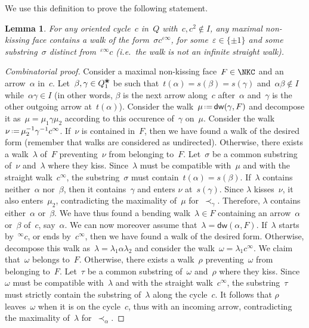 \documentclass{amsart}
\newtheorem{lemma}[theorem]{Lemma}
\theoremstyle{definition}
\newcommand{\eqdef}{\mbox{\,\raisebox{0.2ex}{\scriptsize\ensuremath{\mathrm:}}\ensuremath{=}\,}} %
\newcommand{\ie}{\textit{i.e.}~} %
\newcommand{\blossom}{^\text{\ding{96}}} %
\newcommand{\distinguishedWalk}[2]{\mathsf{dw}(#1,#2)} %
\begin{document}
We use this definition to prove the following statement.

\begin{lemma}
\label{lem:walksThroughcycles}
For any oriented cycle~$c$ in~$Q$ with~$c, c^2\notin I$, any maximal non-kissing face contains a walk of the form~$\sigma c^{\varepsilon\infty}$, for some~$\varepsilon\in\{\pm1\}$ and some substring~$\sigma$ distinct from~$^{\varepsilon\infty}c$ (\ie the walk is not an infinite straight walk).
\end{lemma}

\begin{proof}[Combinatorial proof]
Consider a maximal non-kissing face~$F \in \NKC$ and an arrow~$\alpha$ in~$c$.
Let~$\beta, \gamma \in Q_1\blossom$ be such that~$t(\alpha) = s(\beta) = s(\gamma)$ and~$\alpha\beta \notin I$ while~$\alpha\gamma \in I$ (in other words, $\beta$ is the next arrow along~$c$ after~$\alpha$ and~$\gamma$ is the other outgoing arrow at~$t(\alpha)$).
Consider the walk~$\mu \eqdef \distinguishedWalk{\gamma}{F}$ and decompose it as~$\mu = \mu_1 \gamma \mu_2$ according to this occurence of~$\gamma$ on~$\mu$.
Consider the walk~$\nu \eqdef \mu_2^{-1} \gamma^{-1} c^\infty$.
If~$\nu$ is contained in~$F$, then we have found a walk of the desired form (remember that walks are considered as undirected).
Otherwise, there exists a walk~$\lambda$ of~$F$ preventing~$\nu$ from belonging to~$F$.
Let~$\sigma$ be a common substring of~$\nu$ and~$\lambda$ where they kiss.
Since~$\lambda$ must be compatible with~$\mu$ and with the straight walk~$c^\infty$, the substring~$\sigma$ must contain~${t(\alpha) = s(\beta)}$.
If~$\lambda$ contains neither~$\alpha$ nor~$\beta$, then it contains~$\gamma$ and enters $\nu$ at~$s(\gamma)$.
Since $\lambda$ kisses~$\nu$, it also enters~$\mu_2$, contradicting the maximality of~$\mu$ for~$\prec_\gamma$.
Therefore, $\lambda$ contains either~$\alpha$ or~$\beta$.
We have thus found a bending walk~$\lambda \in F$ containing an arrow~$\alpha$ or~$\beta$ of~$c$, say~$\alpha$.
We can now moreover assume that~$\lambda = \distinguishedWalk{\alpha}{F}$.
If~$\lambda$ starts by~$^\infty c$, or ends by~$c^\infty$, then we have found a walk of the desired form.
Otherwise, decompose this walk as~$\lambda = \lambda_1 \alpha \lambda_2$ and consider the walk~$\omega = \lambda_1 c^\infty$.
We claim that~$\omega$ belongs to~$F$.
Otherwise, there exists a walk~$\rho$ preventing~$\omega$ from belonging to~$F$.
Let~$\tau$ be a common substring of~$\omega$ and~$\rho$ where they kiss.
Since~$\omega$ must be compatible with~$\lambda$ and with the straight walk~$c^\infty$, the substring~$\tau$ must strictly contain the substring of~$\lambda$ along the cycle~$c$.
It follows that $\rho$ leaves~$\omega$ when it is on the cycle~$c$, thus with an incoming arrow, contradicting the maximality of~$\lambda$ for~$\prec_\alpha$.


\end{proof}
\end{document}

